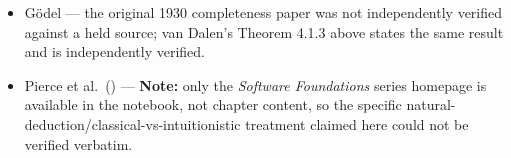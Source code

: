 \begin{itemize}
\item
  Gödel --- the original 1930 completeness paper was not independently verified against a held source; van Dalen's Theorem 4.1.3 above states the same result and is independently verified.
\item
  Pierce et al.~(\cite{PierceSF}) --- \textbf{Note:} only the \emph{Software Foundations} series homepage is available in the notebook, not chapter content, so the specific natural-deduction/classical-vs-intuitionistic treatment claimed here could not be verified verbatim.
\end{itemize}
